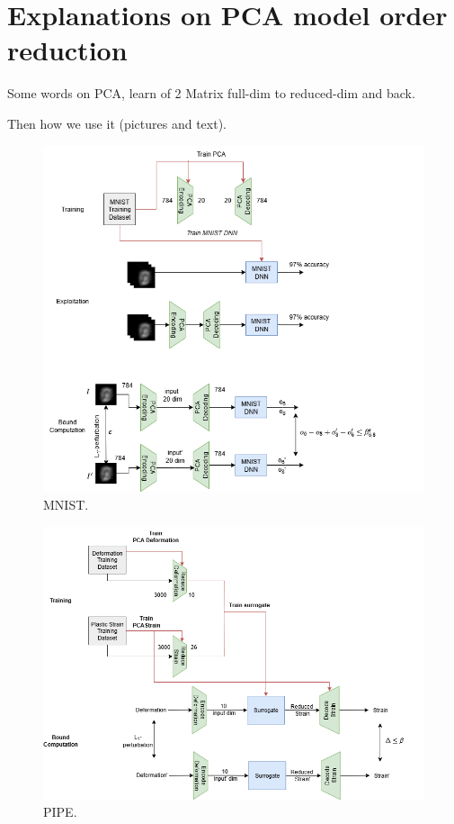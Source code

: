 \section{Explanations on PCA model order reduction}

Some words on PCA, learn of 2 Matrix full-dim to reduced-dim and back.


Then how we use it (pictures and text).

\begin{figure}[]
	\centering
\includegraphics[scale=0.6]{MNIST.png} \hspace{1.5cm}
\caption{MNIST.}
\label{fig.MNIST}
\end{figure}	

\begin{figure}[]
	\centering
\includegraphics[scale=0.6]{PIPE.png} \hspace{1.5cm}
\caption{PIPE.}
\label{fig.PIPE}
\end{figure}	
